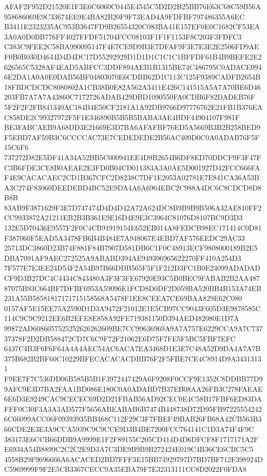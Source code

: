 \documentclass[UTF8,fontset=fandol,zihao=-4,a4paper]{ctexart}
\begin{document}
{{AFAF2F952D21520E1F3E6C6060C0445E4545C5D2D2B25BB76E63C68C59B56A958686069E9C33674EE9E4BA82B20F9F73EAD4A9FDFBF797486355A6EC
B3411E2323235AC953B3647FD9B26554320C083BA41E157EF0E0C1682CF53EA3A0A0D0BB776FF4027FFDF51704FCC08103F1F1F1153F8C203F3FDFC3
C383C9FEE2C58BA990095147F4E7CE9D9B3E7DFAF9F3E7E3E2E2506FD9AEF0B0B030D4644D4D4DC17D55292929D1D1D1C1C1C1BFFDF61B4B9BEFE2E2
626565C5328AF4EAD5ABFCC3DDF894AEB1B1315BE74C486795C0ADACE0946E2DA1A0A0E0DAB56BF04803070E6CDBB62D1C113C125F9389CADFB2654B
18FBDCDCDC8080802A1CB38B0E82A562A3411E426C141515A5A7A70BE6D46203FB7A7A7A43860C7172726ADAB429DBD1090550FA0CDB6F82DADEB76F
5F2F2F2FB841340AC184B4E50CF2181A1A92DB9766D97776762E21FB1B376EAC858DE2C99327972F5F1E346890B5B5B5BABA3AE4BDF44904107F981F
BE3FABCAEB9A68DD3E21669E3D7BA6AFAFBF76ED5A5669B3B2B258BED9F5EBD7AF59B3C6CCCCAC73E7CEDEDEDE2B56AC409D0C0A0ADAB76F5F15C6F6
737272D82E5DF41A34A52BB5C000941EE4D9B2654B6DF8ED70DDCF9F3F47FC3B6FDE3CE8B0AEAE2E3FD0B04CD011383A3A0AE5D001927D42FCC666FA
F4E9CACACAEC2CD1B367CFC2D8238C7DF1E2053A02781E7E841CA36A53BA3C274F83060DEEDEBD4BC52E9DA4A6A6964EBC2C988A4DC6C8CDCD8D8B8B
83AB9F3871629F3E7D747474D4D4D42A72A624DC8B9B9B9B506A32AE810FF2CC9933872A21211EB2B3B361E9E16D4E9E3C3964C81076D8107BC9D3D3
132E5D70436E9557F2F0C4CB91919154E652EB014A8FEDCB98EC171414C0D81F387060F5EAD5A3478FB6B4B484E7A948067E4EBD7AF576EEDC29AC33
25713DC3860D23B74F881F84B7907D581DB6C1F0C48913ECF9808000189B2E5DBA7091AF9AEC272525A9ABABD394AE949396965622270FF410A254D3
7F577E7E3EE24D54F2A54B97B66DDB565F5F1F212D3FC1B0E24099ADADADCF9D3B27DC4C4434C843480A3F3F3FE67920E93C5B0BEC9FABAB2B2AA487
87075B93C664BF7DFBF6953A59096E1FCD8D0DF2D059BA520BB4B153A74EB231A55B58581817171715158568A5478F1EE8CEEA7CE69BAA829E62C080
0157AF5E15EE75A2590D1D3A9472F21012E1E5CB97CC9043F605D3E9878585C114C9C9C9212EE6B2EFE8E858A92FE719381150D394AED482080E1D7A
99872AD6086057525252626262609BE7CC99636969A9A7A757E6229CCA9A7C73737378F2D2DB588472CD7C6C9F72F21062E6D75F7FE5F5BC5FBF7EFC
6437C4B3F6F6F64A4A4AEC54AC6ACA7EA3468D1E3E7C48A52D9DA4A7A7B375B682B2BF60C10229BFECACACACDBB76F2F5FBE7CE4C8914D9A34313131
F9EE7F7C536DD06B585B5B1F3972447429A6F9208F0CCF9E1352C8DDBB77D99AFC9E3D7BA2FAA1BD086E180C0A0ADABD7B37EB08AA26FB3C278FAEAE
6E6D3E9249CAC9CECEC69D2D21FBAB56AD92CEC0E4C58B17FBF6ED83DAFFF0C30F3A3A3AD577F5656ABEABAB6B7474B448738D72D95FB97225554242
6C66099ACC06F09393935BB468C112F29C3F7FBEF49BAB26FB68A42CB563B366CDE2E3E3A9CCA5939C9C9CCE9D3B4BE7200FCC764141C1D3A74F4F9C
383173E6CCB66DDB9A9999E1F2F89155C205CD414D4D6DFCF8F1717171A2FE6934A54B8899C2C2C2E9D3A7C3DE9B9B9B272424E019C4B36CE6CBC5C5
4558B29F9696666A6ACACED2BD7FFF3E15BB74929797D7BD7BF712F398924DC5969999F9F2E5CB3367CECC9A35EBA79F7E32313111CC8D2022F0FDA8
}}
\end{document}
